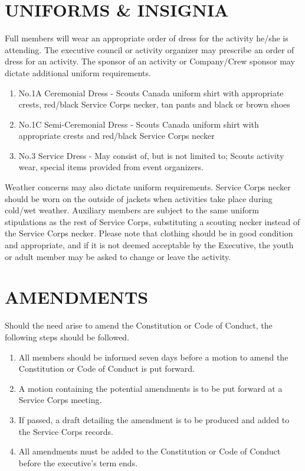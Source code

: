 \documentclass{Service_Corps_Document}
\begin{document}
    \section{UNIFORMS \& INSIGNIA}
    Full members will wear an appropriate order of dress for the activity he/she is attending.
    The executive council or activity organizer may prescribe an order of dress for an activity.
    The sponsor of an activity or Company/Crew sponsor may dictate additional uniform requirements.
    \begin{enumerate}
        \item No.1A Ceremonial Dress - Scouts Canada uniform shirt with appropriate crests, red/black Service Corps necker, tan pants and black or brown shoes
        \item No.1C Semi-Ceremonial Dress - Scouts Canada uniform shirt with appropriate crests and red/black Service Corps necker
        \item No.3 Service Dress - May consist of, but is not limited to;
        Scouts activity wear, special items provided from event organizers.
    \end{enumerate}
    Weather concerns may also dictate uniform requirements.
    Service Corps necker should be worn on the outside of jackets when activities take place during cold/wet weather.
    Auxiliary members are subject to the same uniform stipulations as the rest of Service Corps, substituting a scouting necker instead of the Service Corps necker.
    Please note that clothing should be in good condition and appropriate, and if it is not deemed acceptable by the Executive, the youth or adult member may be asked to change or leave the activity.


    \section{AMENDMENTS}
    Should the need arise to amend the Constitution or Code of Conduct, the following steps should be followed.
    \begin{enumerate}
        \item All members should be informed seven days before a motion to amend the Constitution or Code of Conduct is put forward.
        \item A motion containing the potential amendments is to be put forward at a Service Corps meeting.
        \item If passed, a draft detailing the amendment is to be produced and added to the Service Corps records.
        \item All amendments must be added to the Constitution or Code of Conduct before the executive's term ends.
    \end{enumerate}
\end{document}
